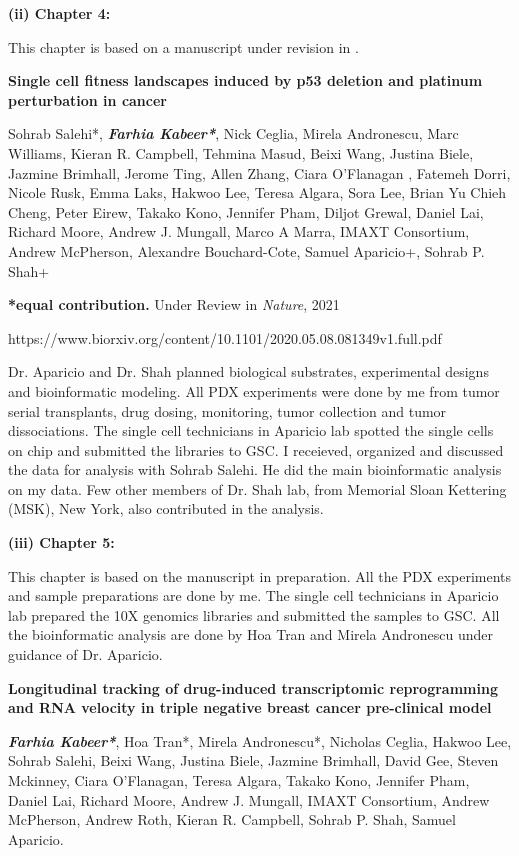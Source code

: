 
  \textbf{(ii) Chapter 4:}

This chapter is based on a manuscript under revision in .


 \textbf{Single  cell  fitness  landscapes  induced  by  p53  deletion and platinum perturbation in cancer}

Sohrab Salehi*, \emph{\textbf{Farhia Kabeer*}}, Nick Ceglia, Mirela Andronescu, Marc Williams, Kieran R. Campbell, Tehmina Masud, Beixi Wang, Justina Biele, Jazmine Brimhall, Jerome Ting, Allen Zhang, Ciara O'Flanagan , Fatemeh Dorri, Nicole Rusk, Emma Laks, Hakwoo Lee, Teresa Algara, Sora Lee, Brian Yu Chieh Cheng, Peter Eirew, Takako Kono, Jennifer Pham, Diljot Grewal, Daniel Lai, Richard Moore, Andrew J. Mungall, Marco A Marra, IMAXT Consortium, Andrew McPherson, Alexandre Bouchard-Cote, Samuel Aparicio+, Sohrab P. Shah+

 \textbf{*equal contribution.} Under Review in \textit{Nature}, 2021

https://www.biorxiv.org/content/10.1101/2020.05.08.081349v1.full.pdf

Dr. Aparicio and Dr. Shah planned biological substrates, experimental designs and bioinformatic modeling. All PDX experiments were done by me from tumor serial transplants, drug dosing, monitoring, tumor collection and tumor dissociations. The single cell technicians in Aparicio lab spotted the single cells on chip and submitted the libraries to \ac{GSC}.
I receieved, organized and discussed the data for analysis with Sohrab Salehi. He did the main bioinformatic analysis on my data. Few other members of Dr. Shah lab, from Memorial Sloan Kettering (MSK), New York, also contributed in the analysis. 


   \textbf{(iii) Chapter 5:}
   
This chapter is based on the manuscript in preparation. All the PDX experiments and sample preparations are done by me. The single cell technicians in Aparicio lab prepared the 10X genomics libraries and submitted the samples to \ac{GSC}. All the bioinformatic analysis are done by Hoa Tran and Mirela Andronescu under guidance of Dr. Aparicio.
  
\textbf{Longitudinal tracking of drug-induced transcriptomic reprogramming and RNA velocity in triple negative breast cancer pre-clinical model}

\emph{\textbf{Farhia Kabeer*}}, Hoa Tran*, Mirela Andronescu*,   
Nicholas Ceglia, Hakwoo Lee, Sohrab Salehi, Beixi Wang, Justina Biele, Jazmine Brimhall, David Gee, Steven Mckinney, Ciara O'Flanagan, Teresa Algara, Takako Kono, Jennifer Pham, Daniel Lai, Richard Moore, Andrew J. Mungall, IMAXT Consortium,  Andrew  McPherson, Andrew Roth, Kieran R. Campbell, Sohrab P. Shah, Samuel Aparicio.